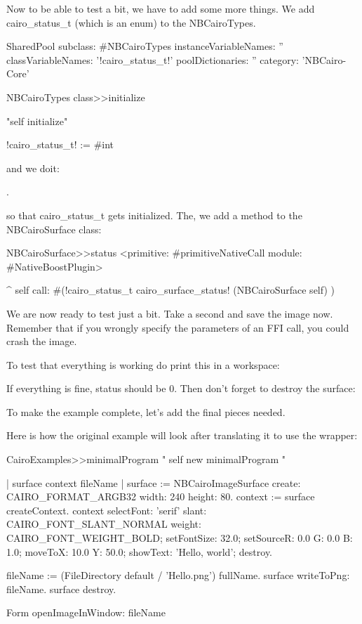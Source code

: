 \documentclass[a4paper,10pt,twoside]{book}
\begin{document}
Now to be able to test a bit, we have to add some more things. We add 
cairo\_status\_t (which is an enum) to the NBCairoTypes.

   
\begin{classdef}{}
SharedPool subclass: #NBCairoTypes
	instanceVariableNames: ''
	classVariableNames: '!cairo\_status\_t!'
	poolDictionaries: ''
	category: 'NBCairo-Core'
\end{classdef}

\begin{code}{}
NBCairoTypes class>>initialize

	"self initialize"
		
	!cairo\_status\_t! := #int
\end{code}

and we doit:

.

so that cairo\_status\_t gets initialized. The, we add a method to
the NBCairoSurface class:

\begin{code}{}
NBCairoSurface>>status
	<primitive: #primitiveNativeCall module: #NativeBoostPlugin>
	
	^ self call: #(!cairo\_status\_t cairo\_surface\_status! (NBCairoSurface self) )
\end{code}

We are now ready to test just a bit. Take a second and save the
image now. Remember that if you wrongly specify the parameters
of an FFI call, you could crash the image.

To test that everything is working do print this in a workspace:


If everything is fine, status should be 0. Then don't forget
to destroy the surface:



To make the example complete, let's add the final pieces needed.

Here is how the original example will look after translating
it to use the wrapper:

\begin{code}{}
CairoExamples>>minimalProgram
	"
	self new minimalProgram
	"
	
	| surface context fileName |
	surface := NBCairoImageSurface create: CAIRO_FORMAT_ARGB32 width: 240 height: 80.
	context := surface createContext.
	context selectFont: 'serif' slant: CAIRO_FONT_SLANT_NORMAL weight: CAIRO_FONT_WEIGHT_BOLD;
			setFontSize: 32.0;
			setSourceR: 0.0 G: 0.0 B: 1.0;
			moveToX: 10.0 Y: 50.0;
			showText: 'Hello, world';
			destroy.
	
	fileName := (FileDirectory default / 'Hello.png') fullName.
	surface writeToPng: fileName.
	surface destroy.

	Form openImageInWindow: fileName
\end{code}
\end{document}
